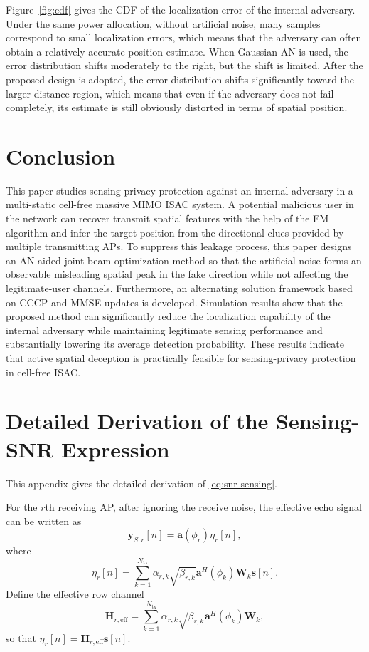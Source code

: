\documentclass[conference,twocolumn,a4paper]{IEEEtran}
\begin{document}
Figure~\ref{fig:cdf} gives the CDF of the localization error of the internal adversary. Under the same power allocation, without artificial noise, many samples correspond to small localization errors, which means that the adversary can often obtain a relatively accurate position estimate. When Gaussian AN is used, the error distribution shifts moderately to the right, but the shift is limited. After the proposed design is adopted, the error distribution shifts significantly toward the larger-distance region, which means that even if the adversary does not fail completely, its estimate is still obviously distorted in terms of spatial position.

\FloatBarrier

\section{Conclusion}
This paper studies sensing-privacy protection against an internal adversary in a multi-static cell-free massive MIMO ISAC system. A potential malicious user in the network can recover transmit spatial features with the help of the EM algorithm and infer the target position from the directional clues provided by multiple transmitting APs. To suppress this leakage process, this paper designs an AN-aided joint beam-optimization method so that the artificial noise forms an observable misleading spatial peak in the fake direction while not affecting the legitimate-user channels. Furthermore, an alternating solution framework based on CCCP and MMSE updates is developed. Simulation results show that the proposed method can significantly reduce the localization capability of the internal adversary while maintaining legitimate sensing performance and substantially lowering its average detection probability. These results indicate that active spatial deception is practically feasible for sensing-privacy protection in cell-free ISAC.


\appendices
\section{Detailed Derivation of the Sensing-SNR Expression}
This appendix gives the detailed derivation of \eqref{eq:snr-sensing}.

For the $r$th receiving AP, after ignoring the receive noise, the effective echo signal can be written as
\begin{equation}
\mathbf{y}_{S,r}[n]=\mathbf{a}(\phi_r)\eta_r[n],
\label{eq:appA-ys-en}
\end{equation}
where
\begin{equation}
\eta_r[n]=\sum_{k=1}^{N_{\mathrm{tx}}}\alpha_{r,k}\sqrt{\beta_{r,k}}\mathbf{a}^H(\phi_k)\mathbf{W}_k\mathbf{s}[n].
\label{eq:appA-eta-en}
\end{equation}
Define the effective row channel
\begin{equation}
\mathbf{H}_{r,\mathrm{eff}}=\sum_{k=1}^{N_{\mathrm{tx}}}\alpha_{r,k}\sqrt{\beta_{r,k}}\mathbf{a}^H(\phi_k)\mathbf{W}_k,
\label{eq:appA-heff-en}
\end{equation}
so that $\eta_r[n]=\mathbf{H}_{r,\mathrm{eff}}\mathbf{s}[n]$.
\end{document}
